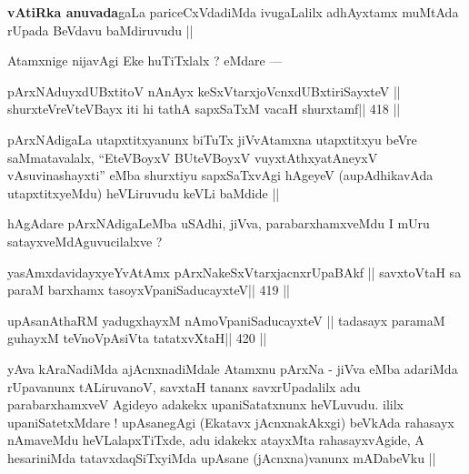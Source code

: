 \begin{artha}
{\bf vAtiRka anuvada}gaLa pariceCxVdadiMda ivugaLalilx adhAyxtamx muMtAda rUpada BeVdavu baMdiruvudu ||
\end{artha}

\begin{artha}
Atamxnige nijavAgi Eke huTiTxlalx ? eMdare ---
\end{artha}

\begin{shl}
pArxNAduyxdUBxtitoV nAnAyx keSxVtarxjoVcnxdUBxtiriSayxteV ||
shurxteVreVteVBayx iti hi tathA sapxSaTxM vacaH shurxtamf\hfill || 418 ||
\end{shl}

\begin{artha}
pArxNAdigaLa utapxtitxyanunx biTuTx jiVvAtamxna utapxtitxyu beVre saMmatavalalx, ``EteVBoyxV BUteVBoyxV vuyxtAthxyatAneyxV vAsuvinashayxti'' eMba shurxtiyu sapxSaTxvAgi hAgeyeV (aupAdhikavAda utapxtitxyeMdu) heVLiruvudu keVLi baMdide ||
\end{artha}

\begin{artha}
hAgAdare pArxNAdigaLeMba uSAdhi, jiVva, parabarxhamxveMdu I mUru satayxveMdAguvucilalxve ?
\end{artha}

\begin{shl}
yasAmxdavidayxyeYvA\s\s tAmx pArxNakeSxVtarxjacnxrUpaBAkf ||
savxtoV\s taH sa paraM barxhamx tasoyxVpaniSaducayxteV\hfill || 419 ||
\end{shl}

\begin{shl}
upAsanAthaRM yadugxhayxM nAmoVpaniSaducayxteV ||
tadasayx paramaM guhayxM teVnoVpAsiVta tatatxvXtaH\hfill || 420 ||
\end{shl}

\begin{artha}
yAva kAraNadiMda ajAcnxnadiMdale Atamxnu pArxNa - jiVva eMba adariMda rUpavanunx tALiruvanoV, savxtaH tananx savxrUpadalilx adu parabarxhamxveV Agideyo adakekx upaniSatatxnunx heVLuvudu. ililx upaniSatetxMdare ! upAsanegAgi (Ekatavx jAcnxnakAkxgi) beVkAda rahasayx nAmaveMdu heVLalapxTiTxde, adu idakekx atayxMta rahasayxvAgide, A hesariniMda tatavxdaqSiTxyiMda upAsane (jAcnxna)vanunx mADabeVku ||
\end{artha}
